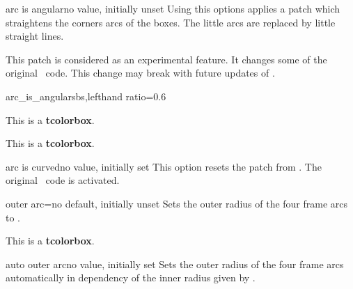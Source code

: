 \clearpage
\begin{docTcbKey}[][doc new=2015-05-05]{arc is angular}{}{no value, initially unset}
  Using this options applies a patch which straightens the corners arcs of
  the boxes. The little arcs are replaced by little straight lines.
  \begin{marker}
  This patch is considered as an experimental feature.
  It changes some of the original \tikzname\ code. This change may break
  with future updates of \tikzname.
  \end{marker}

\begin{exdispExample*}{arc_is_angular}{sbs,lefthand ratio=0.6}

\begin{tcolorbox}
This is a \textbf{tcolorbox}.
\end{tcolorbox}
\begin{tcolorbox}
This is a \textbf{tcolorbox}.
\end{tcolorbox}
\end{exdispExample*}

\end{docTcbKey}


\begin{docTcbKey}[][doc new=2015-05-05]{arc is curved}{}{no value, initially set}
  This option resets the patch from . The
  original \tikzname\ code is activated.
\end{docTcbKey}


\begin{docTcbKey}{outer arc}{=}{no default, initially unset}
  Sets the outer radius of the four frame arcs to .
\begin{dispExample}

\begin{tcolorbox}[arc=4mm,outer arc=1mm]
This is a \textbf{tcolorbox}.
\end{tcolorbox}
\end{dispExample}
\end{docTcbKey}


\begin{docTcbKey}{auto outer arc}{}{no value, initially set}
  Sets the outer radius of the four frame arcs automatically in
  dependency of the inner radius given by .
\end{docTcbKey}


